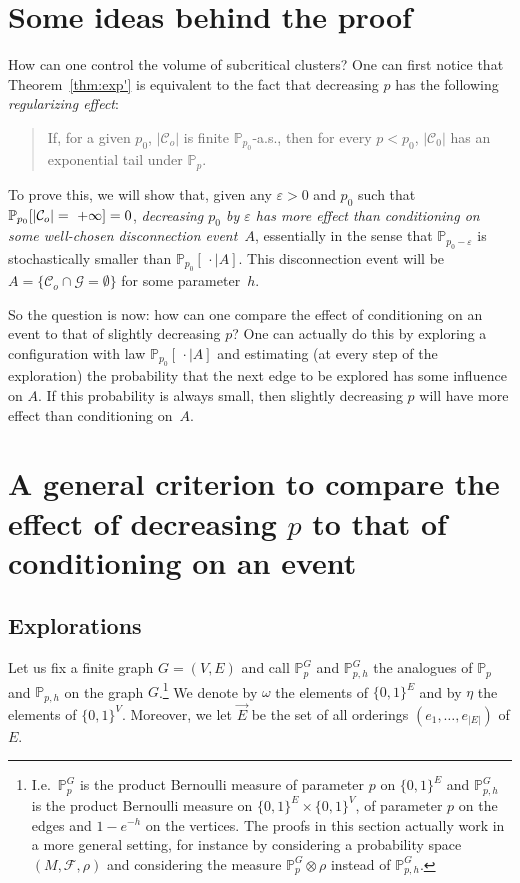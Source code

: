 \documentclass[AHL,Unicode,longabstracts,published]{cedram}
\newcommand{\Pro}{\mathbb{P}}
\newcommand{\clF}{\mathcal{F}}
\newcommand{\calC}{\mathcal{C}}
\newcommand{\calG}{\mathcal{G}}
\begin{document}
\section{Some ideas behind the proof}\label{sec:ideas}

How can one control the volume of subcritical clusters? One can first notice that Theorem~\ref{thm:exp'} is equivalent to the fact that decreasing $p$ has the following \emph{regularizing effect}:
\begin{quote}
If, for a given $p_0$, $|\calC_o|$ is finite $\Pro_{p_0}$-a.s., then for every $p<p_0$, $|\calC_0|$ has an exponential tail under $\Pro_p$.
\end{quote}
To prove this, we will show that, given any $\varepsilon>0$ and $p_0$ such that $\Pro_{p_0}[|\calC_o|=~+\infty]\linebreak=0$, \emph{decreasing $p_0$ by $\varepsilon$ has more effect than conditioning on some well-chosen disconnection event~$A$}, essentially in the sense that $\Pro_{p_0-\varepsilon}$ is stochastically smaller than $\Pro_{p_0}[\,\cdot\mid A]$. This disconnection event will be $A=\{ \calC_o \cap \calG = \emptyset\}$ for some parameter~$h$.



So the question is now: how can one compare the effect of conditioning on an event to that of slightly decreasing $p$? One can actually do this by exploring a configuration with law $\Pro_{p_0}[\, \cdot \mid A]$ and estimating (at every step of the exploration) the probability that the next edge to be explored has some influence on $A$. If this probability is always small, then slightly decreasing $p$ will have more effect than conditioning on~$A$.

\section{A general criterion to compare the effect of decreasing \texorpdfstring{$p$}{p} to that of conditioning on an event}\label{sec:gen}

\subsection{Explorations}

Let us fix a finite graph $G=(V,E)$ and call $\Pro_p^G$ and $\Pro_{p,h}^{G}$ the analogues of $\Pro_p$ and $\Pro_{p,h}$ on the graph $G$.\footnote{I.e.\ $\Pro_p^G$ is the product Bernoulli measure of parameter $p$ on $\{0,1\}^E$ and $\Pro_{p,h}^G$ is the product Bernoulli measure on $\{0,1\}^E\times\{0,1\}^V$, of parameter $p$ on the edges and $1-e^{-h}$ on the vertices. The proofs in this section actually work in a more general setting, for instance by considering a probability space $(M,\clF,\rho)$ and considering the measure $\Pro_p^G\otimes\rho$ instead of $\Pro_{p,h}^G$.} We denote by $\omega$ the elements of $\{0,1\}^E$ and by $\eta$ the elements of $\{0,1\}^V$. Moreover, we let $\vec{E}$ be the set of all orderings $(e_1,\dots,e_{|E|})$ of $E$.
\end{document}
